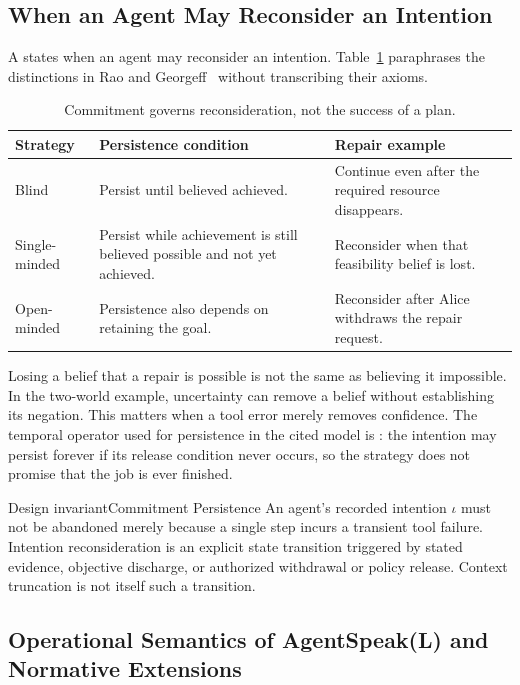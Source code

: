 \subsection{When an Agent May Reconsider an Intention}
A  states when an agent may reconsider an
intention. Table~\ref{tab:commitment-strategies} paraphrases the distinctions in
Rao and Georgeff~ without transcribing their axioms.
\begin{table}[H]
\centering\small
\begin{tabularx}{\textwidth}{@{}lXX@{}}
\toprule
\textbf{Strategy} & \textbf{Persistence condition} & \textbf{Repair example}\\
\midrule
Blind & Persist until believed achieved. & Continue even after the required resource disappears.\\
Single-minded & Persist while achievement is still believed possible and not yet achieved. & Reconsider when that feasibility belief is lost.\\
Open-minded & Persistence also depends on retaining the goal. & Reconsider after Alice withdraws the repair request.\\
\bottomrule
\end{tabularx}
\caption{Commitment governs reconsideration, not the success of a plan.}
\label{tab:commitment-strategies}
\end{table}
Losing a belief that a repair is possible is not the same as believing it
impossible. In the two-world example, uncertainty can remove a belief without
establishing its negation. This matters when a tool error merely removes
confidence. The temporal operator used for persistence in the cited model is
: the intention may persist forever if its release condition
never occurs, so the strategy does not promise that the job is ever finished.


\begin{pdclaim}{Design invariant}{Commitment Persistence}\label{inv:commitment-persistence}
An agent's recorded intention $\iota$ must not be abandoned merely because a single step incurs a transient tool failure. Intention reconsideration is an explicit state transition triggered by stated evidence, objective discharge, or authorized withdrawal or policy release. Context truncation is not itself such a transition.
\end{pdclaim}

\subsection{Operational Semantics of AgentSpeak(L) and Normative Extensions}

